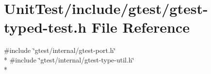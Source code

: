 \hypertarget{gtest-typed-test_8h}{\section{Unit\+Test/include/gtest/gtest-\/typed-\/test.h File Reference}
\label{gtest-typed-test_8h}
}
{\ttfamily \#include \char`\"{}gtest/internal/gtest-\/port.\+h\char`\"{}}\\*
{\ttfamily \#include \char`\"{}gtest/internal/gtest-\/type-\/util.\+h\char`\"{}}\\*
